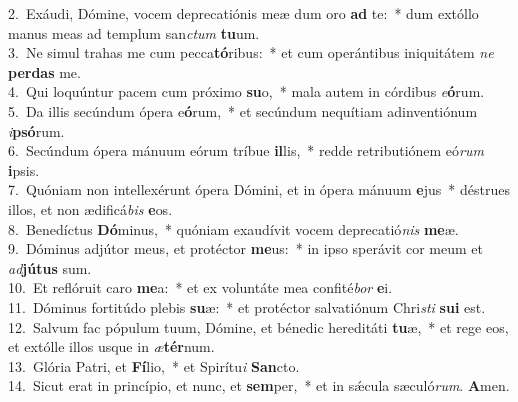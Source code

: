{2.~}Exáudi, Dómine, vocem deprecatiónis meæ dum oro \textbf{ad} te:~* dum extóllo manus meas ad templum san\textit{ctum} \textbf{tu}um.\\
{3.~}Ne simul trahas me cum pecca\textbf{tó}ribus:~* et cum operántibus iniquitátem \textit{ne} \textbf{per}\textbf{das} me.\\
{4.~}Qui loquúntur pacem cum próximo \textbf{su}o,~* mala autem in córdibus \textit{e}\textbf{ó}rum.\\
{5.~}Da illis secúndum ópera e\textbf{ó}rum,~* et secúndum nequítiam adinventiónum \textit{i}\textbf{psó}rum.\\
{6.~}Secúndum ópera mánuum eórum tríbue \textbf{il}lis,~* redde retributiónem eó\textit{rum} \textbf{i}psis.\\
{7.~}Quóniam non intellexérunt ópera Dómini, et in ópera mánuum \textbf{e}jus~* déstrues illos, et non ædificá\textit{bis} \textbf{e}os.\\
{8.~}Benedíctus \textbf{Dó}minus,~* quóniam exaudívit vocem deprecatió\textit{nis} \textbf{me}æ.\\
{9.~}Dóminus adjútor meus, et protéctor \textbf{me}us:~* in ipso sperávit cor meum et \textit{ad}\textbf{jú}\textbf{tus} sum.\\
{10.~}Et reflóruit caro \textbf{me}a:~* et ex voluntáte mea confité\textit{bor} \textbf{e}i.\\
{11.~}Dóminus fortitúdo plebis \textbf{su}æ:~* et protéctor salvatiónum Chri\textit{sti} \textbf{su}\textbf{i} est.\\
{12.~}Salvum fac pópulum tuum, Dómine, et bénedic hereditáti \textbf{tu}æ,~* et rege eos, et extólle illos usque in \textit{æ}\textbf{tér}num.\\
{13.~}Glória Patri, et \textbf{Fí}lio,~* et Spirítu\textit{i} \textbf{San}cto.\\
{14.~}Sicut erat in princípio, et nunc, et \textbf{sem}per,~* et in sǽcula sæculó\textit{rum}. \textbf{A}men.\\
